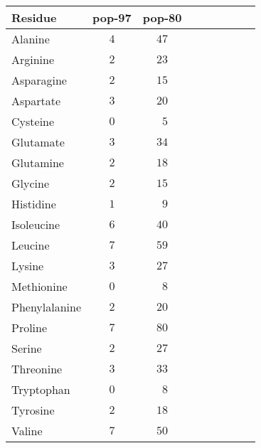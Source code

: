 \documentclass[12pt]{article}
\begin{document}
\begin{center}
\footnotesize
\begin{tabular}{lcccccccc}
Residue & pop-97 & pop-80 \\
\hline Alanine   & $4$ & $47$ \\
Arginine         & $2$ & $23$ \\
Asparagine       & $2$ & $15$ \\
Aspartate        & $3$ & $20$ \\
Cysteine         & $0$ & $\phantom{0}5$ \\
Glutamate        & $3$ & $34$ \\
Glutamine        & $2$ & $18$ \\
Glycine          & $2$ & $15$ \\
Histidine        & $1$ & $\phantom{0}9$ \\
Isoleucine       & $6$ & $40$ \\
Leucine          & $7$ & $59$ \\
Lysine           & $3$ & $27$ \\
Methionine       & $0$ & $\phantom{0}8$ \\
Phenylalanine    & $2$ & $20$ \\
Proline          & $7$ & $80$ \\
Serine           & $2$ & $27$ \\
Threonine        & $3$ & $33$ \\
Tryptophan       & $0$ & $\phantom{0}8$ \\
Tyrosine         & $2$ & $18$ \\
Valine           & $7$ & $50$ \\
\hline
\end{tabular}
\end{center}
\end{document}
